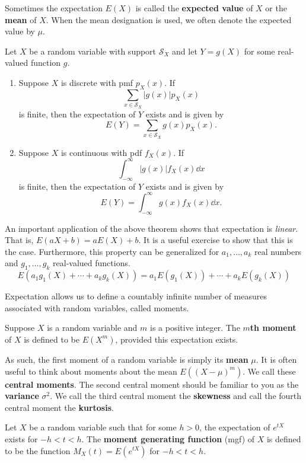Sometimes the expectation $E(X)$ is called the \textbf{expected value} of $X$ or the \textbf{mean} of $X$. When the mean designation is used, we often denote the expected value by $\mu$.

\begin{theorem}
	Let $X$ be a random variable with support $\mathcal S_X$ and let $Y=g(X)$ for some real-valued function $g$.
	\begin{enumerate}[label=\color{main}(\alph*)]
		\item Suppose $X$ is discrete with pmf $p_X(x)$. If $$\sum_{x\in\mathcal S_X}|g(x)|p_X(x)$$ is finite, then the expectation of $Y$ exists and is given by $$E(Y)=\sum_{x\in\mathcal S_X}g(x)p_X(x).$$
		\item Suppose $X$ is continuous with pdf $f_X(x)$. If $$\int_{-\infty}^{\infty}|g(x)|f_X(x)\dd x$$ is finite, then the expectation of $Y$ exists and is given by $$E(Y)=\int_{-\infty}^{\infty}g(x)f_X(x)\dd x.$$
	\end{enumerate}
\end{theorem}

An important application of the above theorem shows that expectation is \textit{linear}. That is, $E(aX+b)=aE(X)+b$. It is a useful exercise to show that this is the case. Furthermore, this property can be generalized for $a_1,\hdots,a_k$ real numbers and $g_1,\hdots,g_k$ real-valued functions.
$$E(a_1g_1(X)+\cdots+a_kg_k(X))=a_1E(g_1(X))+\cdots+a_kE(g_k(X))$$

Expectation allows us to define a countably infinite number of measures associated with random variables, called moments.

\begin{definition}[moment]
	Suppose $X$ is a random variable and $m$ is a positive integer. The \textbf{$m$th moment} of $X$ is defined to be $E(X^m)$, provided this expectation exists.
\end{definition}

As such, the first moment of a random variable is simply its \textbf{mean} $\mu$. It is often useful to think about moments about the mean $E((X-\mu)^m)$. We call these \textbf{central moments}. The second central moment should be familiar to you as the \textbf{variance} $\sigma^2$. We call the third central moment the \textbf{skewness} and call the fourth central moment the \textbf{kurtosis}.

\begin{definition}[mgf]
	Let $X$ be a random variable such that for some $h>0$, the expectation of $e^{tX}$ exists for $-h<t<h$. The \textbf{moment generating function} (mgf) of $X$ is defined to be the function $M_X(t)=E(e^{tX})$ for $-h<t<h$.
\end{definition}

